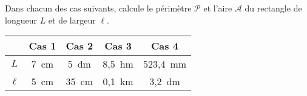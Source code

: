 Dans chacun des cas suivants, calcule le périmètre $\mathscr{P}$ et l'aire $\mathscr{A}$ du rectangle de longueur $L$ et de largeur $\ell$.
\begin{center}
  \begin{tabular}{|c|c|c|c|c|}
\cline{2-5}
\multicolumn{1}{c|}{}&Cas 1&Cas 2&Cas 3&Cas 4\\
\hline
$L$&7~cm&5~dm&8,5~hm&523,4~mm\\
\hline
$\ell$&5~cm&35~cm&0,1~km&3,2~dm\\
\hline
  \end{tabular}
\end{center}
